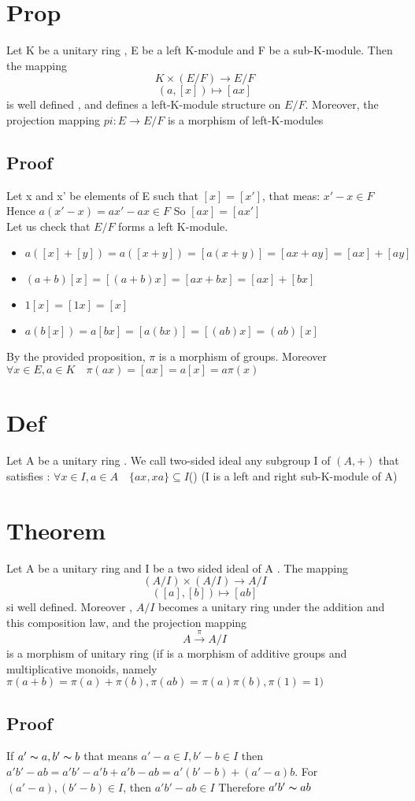 \documentclass{book}
\begin{document}
\section{Prop}
Let K be a unitary ring , E be a left K-module and F be a sub-K-module. Then the mapping $$K\times(E/ F)\rightarrow E / F$$$$(a,[x])\mapsto[ax]$$
is well defined , and defines a left-K-module structure on $E/F$. Moreover, the projection mapping $pi:E\rightarrow E/F$ is a morphism of left-K-modules
\subsection{Proof}
Let x and x' be elements of E such that $[x]=[x']$, that meas: $x'-x\in F$ Hence $a(x'-x)=ax'-ax\in F$ So $[ax]=[ax']$\\
Let us check that $E/F$ forms a left K-module.
\begin{itemize}
    \item $a([x]+[y])=a([x+y])=[a(x+y)]=[ax+ay]=[ax]+[ay]$
    \item $(a+b)[x]=[(a+b)x]=[ax+bx]=[ax]+[bx]$
    \item $1[x]=[1x]=[x]$
    \item $a(b[x])=a[bx]=[a(bx)]=[(ab)x]=(ab)[x]$
\end{itemize}
By the provided proposition, $\pi $ is a morphism of groups. Moreover $\forall x\in E,a\in K\quad \pi(ax)=[ax]=a[x]=a\pi(x)$
\section{Def}
Let A be a unitary ring . We call two-sided ideal any subgroup I of $(A,+)$ that satisfies : $\forall x\in I,a\in A\quad \{ax,xa\}\subseteq I$() (I is a left and right sub-K-module of A)
\section{Theorem}
Let A be a unitary ring and I be a two sided ideal of A . The mapping $$(A/I)\times(A/I)\rightarrow A/I$$$$([a],[b])\mapsto[ab]$$ si well defined. Moreover , $A/I$ becomes a unitary ring under the addition and this composition law, and the projection mapping $$A\stackrel{\pi}{\longrightarrow} A/I$$ is a morphism of unitary ring (if is a morphism of additive groups and multiplicative monoids, namely $\pi(a+b)=\pi(a)+\pi(b), \pi(ab)=\pi(a)\pi(b),\pi(1)=1)$
\subsection{Proof}
If $a'\thicksim a,b'\thicksim b$ that means $a'-a\in I,b'-b\in I$ then $a'b'-ab=a'b'-a'b+a'b-ab=a'(b'-b)+(a'-a)b$. For $(a'-a),(b'-b)\in I$, then $a'b'-ab\in I$ Therefore $a'b'\thicksim ab$
\end{document}
